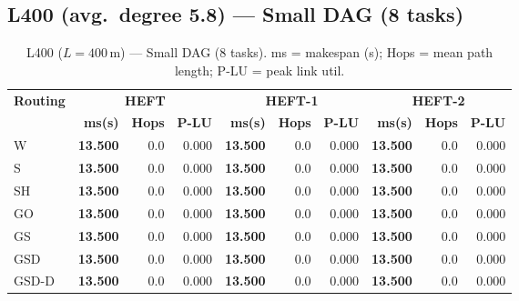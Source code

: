 \documentclass[11pt]{article}
\newcommand{\win}[1]{\textcolor{green!50!black}{\textbf{#1}}}
\begin{document}
\subsection{L400 (avg.\ degree 5.8) --- Small DAG (8 tasks)}
\begin{table}[H]
\centering\small
\begin{tabular}{l r r r r r r r r r}
\toprule
\textbf{Routing} & \multicolumn{3}{c}{\textbf{HEFT}} & \multicolumn{3}{c}{\textbf{HEFT-1}} & \multicolumn{3}{c}{\textbf{HEFT-2}} \\
\cmidrule(lr){2-4}\cmidrule(lr){5-7}\cmidrule(lr){8-10}
& \textbf{ms(s)} & \textbf{Hops} & \textbf{P-LU} & \textbf{ms(s)} & \textbf{Hops} & \textbf{P-LU} & \textbf{ms(s)} & \textbf{Hops} & \textbf{P-LU} \\
\midrule
  W & \win{13.500} & 0.0 & 0.000 & \win{13.500} & 0.0 & 0.000 & \win{13.500} & 0.0 & 0.000 \\
  S & \win{13.500} & 0.0 & 0.000 & \win{13.500} & 0.0 & 0.000 & \win{13.500} & 0.0 & 0.000 \\
  SH & \win{13.500} & 0.0 & 0.000 & \win{13.500} & 0.0 & 0.000 & \win{13.500} & 0.0 & 0.000 \\
  GO & \win{13.500} & 0.0 & 0.000 & \win{13.500} & 0.0 & 0.000 & \win{13.500} & 0.0 & 0.000 \\
  GS & \win{13.500} & 0.0 & 0.000 & \win{13.500} & 0.0 & 0.000 & \win{13.500} & 0.0 & 0.000 \\
  GSD & \win{13.500} & 0.0 & 0.000 & \win{13.500} & 0.0 & 0.000 & \win{13.500} & 0.0 & 0.000 \\
  GSD-D & \win{13.500} & 0.0 & 0.000 & \win{13.500} & 0.0 & 0.000 & \win{13.500} & 0.0 & 0.000 \\
\bottomrule
\end{tabular}
\caption{L400 ($L=400$\,m) --- Small DAG (8 tasks). ms = makespan (s); Hops = mean path length; P-LU = peak link util.}
\end{table}
\end{document}
